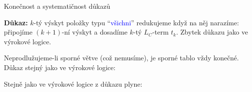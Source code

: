 \documentclass{beamer}
\begin{document}
\begin{frame}{Konečnost a systematičnost důkazů}

    \pause

    \pause
    \textbf{Důkaz:} $k$-tý výskyt položky typu ``\textcolor{blue}{všichni}'' redukujeme když na něj narazíme: připojíme $(k+1)$-ní výskyt a dosadíme $k$-tý $L_C$-term $t_k$. Zbytek důkazu jako ve výrokové logice.\hfill\qedsymbol

    \bigskip

    \pause
    Neprodlužujeme-li sporné větve (což nemusíme), je sporné tablo vždy konečné. Důkaz stejný jako ve výrokové logice:

    \pause

    \bigskip

    \pause
    Stejně jako ve výrokové logice z důkazu plyne:

    \pause
    
\end{frame}
\end{document}
